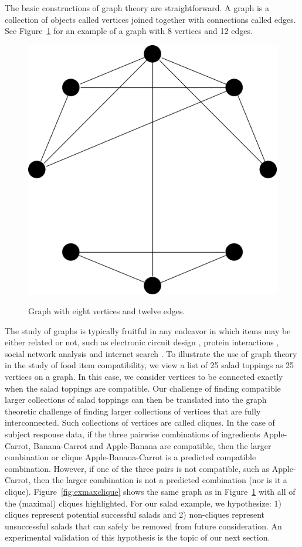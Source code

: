 The basic constructions of graph theory are straightforward.  A graph is a collection of objects called vertices \citep{Bollobaas1998} joined together with connections called edges.  See Figure~\ref{fig:exgraph} for an example of a graph with 8 vertices and 12 edges.  

\begin{figure}[h!]
\caption[Example graph.]{Graph with eight vertices and twelve edges.}
\centering
\includegraphics[width=.6\textwidth]{./img/basic_graph.png}
\label{fig:exgraph}
\end{figure}

The study of graphs is typically fruitful in any endeavor in which items may be either related or not, such as electronic circuit design \citep{Bollobaas1998},  protein interactions \citep{Palla2005}, social network analysis \citep{Knoke2008} and internet search \citep{Brin1998}.  To illustrate the use of graph theory in the study of food item compatibility, we view a list of 25 salad toppings as 25 vertices on a graph.  In this case, we consider vertices to be connected exactly when the salad toppings are compatible.  Our challenge of finding compatible larger collections of salad toppings can then be translated into the graph theoretic challenge of finding larger collections of vertices that are fully interconnected.  Such collections of vertices are called cliques.  In the case of subject response data, if the three pairwise combinations of ingredients Apple-Carrot, Banana-Carrot and Apple-Banana are compatible, then the larger combination or clique Apple-Banana-Carrot is a predicted compatible combination.  However, if one of the three pairs is not compatible, such as Apple-Carrot, then the larger combination is not a predicted combination (nor is it a clique).  Figure~\ref{fig:exmaxclique} shows the same graph as in Figure~\ref{fig:exgraph} with all of the (maximal) cliques highlighted.  For our salad example, we hypothesize: 1) cliques represent potential successful salads and 2) non-cliques represent unsuccessful salads that can safely be removed from future consideration.  An experimental validation of this hypothesis is the topic of our next section.  

